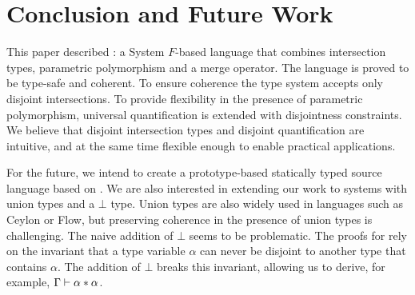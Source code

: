 \section{Conclusion and Future Work}
\label{sec:conclusion}

This paper described \name: a System $F$-based language that combines
intersection types, parametric polymorphism and a merge operator.
The language is proved to be type-safe and coherent.
To ensure coherence the type system accepts only
disjoint intersections. To provide flexibility in the presence of parametric polymorphism,
universal quantification is extended with
disjointness constraints. We believe that disjoint intersection types
and disjoint quantification are intuitive, and at the same time
flexible enough to enable practical applications.


For the future, we intend to create a prototype-based statically typed
source language based on \name.  We are also interested in extending
our work to systems with union types and a $\bot$ type. Union types
are also widely used in languages such as Ceylon or Flow, but
preserving coherence in the presence of union types is
challenging. The naive addition of $\bot$ seems to be problematic. 
The proofs for \name rely on the invariant that a type variable $\alpha$ can never be disjoint 
to another type that contains $\alpha$. The addition of $\bot$ breaks
this invariant, allowing us to derive, for example, $\Gamma \vdash \alpha * \alpha$.



